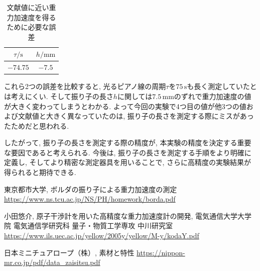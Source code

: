 \documentclass{jarticle}
\begin{document}
\begin{table}[h]
  \centering
  \caption{文献値に近い重力加速度を得るために必要な誤差}
  \begin{tabular}{cc}
    \hline
    $\tau/\mathrm{s}$ & $h/\mathrm{mm}$ \\
    \hline
    $-74.75$ & $-7.5$ \\
    \hline
  \end{tabular}
\end{table}

これら2つの誤差を比較すると, 光るピアノ線の周期$\tau$を$75\,\mathrm{s}$も長く測定していたとは考えにくい.
そして振り子の長さ$h$に関しては$7.5\,\mathrm{mm}$のずれで重力加速度の値が大きく変わってしまうとわかる.
よって今回の実験で4つ目の値が他3つの値および文献値と大きく異なっていたのは, 振り子の長さを測定する際にミスがあったためだと思われる.

したがって, 振り子の長さを測定する際の精度が, 本実験の精度を決定する重要な要因であると考えられる.
今後は, 振り子の長さを測定する手順をより明確に定義し, そしてより精密な測定器具を用いることで, さらに高精度の実験結果が得られると期待できる.

\begin{thebibliography}{99}

  東京都市大学, ボルダの振り子による重力加速度の測定 \url{https://www.ns.tcu.ac.jp/NS/PH/homework/borda.pdf}

  小田悠介, 原子干渉計を用いた高精度な重力加速度計の開発, 電気通信大学大学院 電気通信学研究科 量子・物質工学専攻 中川研究室 \url{https://www.ils.uec.ac.jp/yellow/2005y/yellow/M-y/kodaY.pdf}

  日本ミニチュアロープ（株）, 素材と特性 \url{https://nippon-mr.co.jp/pdf/data_zaisitsu.pdf}

\end{thebibliography}
\end{document}
